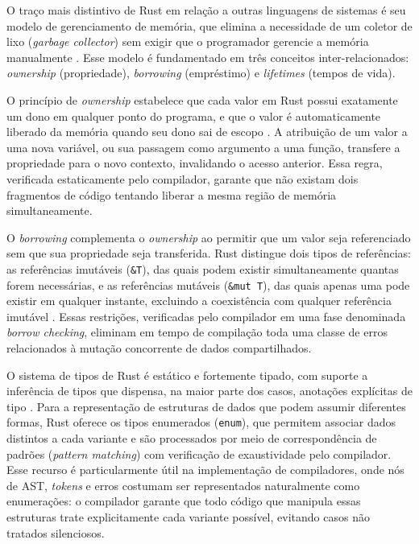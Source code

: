 \documentclass[
    12pt
    ,oneside
    ,a4paper
    ,chapter=TITLE
    ,section=TITLE
    ,sumario=abnt-6027-2012]{abntex2}
\begin{document}
O traço mais distintivo de Rust em relação a outras linguagens de sistemas é seu modelo de
gerenciamento de memória, que elimina a necessidade de um coletor de lixo (\textit{garbage
collector}) sem exigir que o programador gerencie a memória manualmente \cite{klabnik2019}. Esse
modelo é fundamentado em três conceitos inter-relacionados: \textit{ownership} (propriedade),
\textit{borrowing} (empréstimo) e \textit{lifetimes} (tempos de vida).

O princípio de \textit{ownership} estabelece que cada valor em Rust possui exatamente um
dono em qualquer ponto do programa, e que o valor é automaticamente liberado da memória
quando seu dono sai de escopo \cite{klabnik2019}. A atribuição de um valor a uma nova variável,
ou sua passagem como argumento a uma função, transfere a propriedade para o novo contexto,
invalidando o acesso anterior. Essa regra, verificada estaticamente pelo compilador, garante
que não existam dois fragmentos de código tentando liberar a mesma região de memória
simultaneamente.

O \textit{borrowing} complementa o \textit{ownership} ao permitir que um valor seja
referenciado sem que sua propriedade seja transferida. Rust distingue dois tipos de
referências: as referências imutáveis (\texttt{\&T}), das quais podem existir
simultaneamente quantas forem necessárias, e as referências mutáveis (\texttt{\&mut T}),
das quais apenas uma pode existir em qualquer instante, excluindo a coexistência com qualquer
referência imutável \cite{klabnik2019}. Essas restrições, verificadas pelo compilador em uma
fase denominada \textit{borrow checking}, eliminam em tempo de compilação toda uma classe de
erros relacionados à mutação concorrente de dados compartilhados.

O sistema de tipos de Rust é estático e fortemente tipado, com suporte a inferência de tipos
que dispensa, na maior parte dos casos, anotações explícitas de tipo \cite{klabnik2019}. Para a
representação de estruturas de dados que podem assumir diferentes formas, Rust oferece os
tipos enumerados (\texttt{enum}), que permitem associar dados distintos a cada variante
e são processados por meio de correspondência de padrões (\textit{pattern matching}) com
verificação de exaustividade pelo compilador. Esse recurso é particularmente útil na
implementação de compiladores, onde nós de AST, \textit{tokens} e erros costumam ser representados
naturalmente como enumerações: o compilador garante que todo código que manipula essas
estruturas trate explicitamente cada variante possível, evitando casos não tratados silenciosos.
\end{document}

